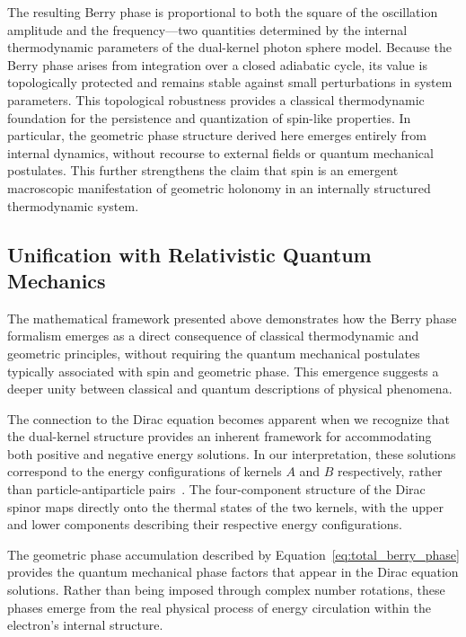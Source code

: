 \documentclass[%
 reprint,
 amsmath,amssymb,
 aps,
]{revtex4-1}
\numberwithin{equation}{section}%
\begin{document}
The resulting Berry phase is proportional to both the square of the oscillation amplitude and the frequency---two quantities determined by the internal thermodynamic parameters of the dual-kernel photon sphere model. Because the Berry phase arises from integration over a closed adiabatic cycle, its value is topologically protected and remains stable against small perturbations in system parameters. This topological robustness provides a classical thermodynamic foundation for the persistence and quantization of spin-like properties. In particular, the geometric phase structure derived here emerges entirely from internal dynamics, without recourse to external fields or quantum mechanical postulates. This further strengthens the claim that spin is an emergent macroscopic manifestation of geometric holonomy in an internally structured thermodynamic system.


\subsection{Unification with Relativistic Quantum Mechanics} \label{subsec:unification}

The mathematical framework presented above demonstrates how the Berry phase formalism emerges as a direct consequence of classical thermodynamic and geometric principles, without requiring the quantum mechanical postulates typically associated with spin and geometric phase. This emergence suggests a deeper unity between classical and quantum descriptions of physical phenomena.

The connection to the Dirac equation becomes apparent when we recognize that the dual-kernel structure provides an inherent framework for accommodating both positive and negative energy solutions. In our interpretation, these solutions correspond to the energy configurations of kernels $A$ and $B$ respectively, rather than particle-antiparticle pairs~\cite{hanamura1811.0312}. The four-component structure of the Dirac spinor maps directly onto the thermal states of the two kernels, with the upper and lower components describing their respective energy configurations.

The geometric phase accumulation described by Equation~\eqref{eq:total_berry_phase} provides the quantum mechanical phase factors that appear in the Dirac equation solutions. Rather than being imposed through complex number rotations, these phases emerge from the real physical process of energy circulation within the electron's internal structure.
\end{document}
